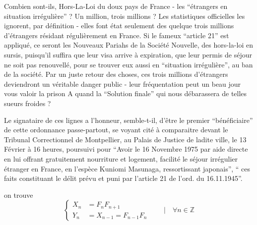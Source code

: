 Combien sont-ils,  Hors-La-Loi du doux pays de France -
les ``étrangers en situation irrégulière'' ? Un million, trois millions ?
Les statistiques officielles les ignorent, par définition - elles font
état seulement des quelque trois millions d'étrangers résidant régulièrement
en France. Si le fameux ``article 21'' est appliqué, ce seront  les
Nouveaux Pariahs de la Société Nouvelle, des hors-la-loi en sursis,
puisqu'il suffira que leur visa arrive à expiration, que leur permis de
séjour ne soit pas renouvellé, pour se trouver eux aussi en ``situation
irrégulière'', au ban de la société. Par un juste retour des choses, ces
trois millions d'étrangers deviendront un véritable danger public - leur
fréquentation peut un beau jour vous valoir la prison\handwritten{!} A quand la ``Solution
finale'' qui nous débarassera de telles sueurs froides ?

Le signataire de ces lignes a l'honneur, semble-t-il, d'être le premier
``bénéficiaire'' de cette ordonnance passe-partout, se voyant cité à
comparaitre devant le Tribunal Correctionnel de Montpellier, au Palais de
Justice de ladite ville, le 13 Février à 16 heures, poursuivi pour ``Avoir
le 16 Novembre 1975 par aide directe en lui offrant gratuitement nourriture
et logement, facilité le séjour irrégulier  étranger en France, en
l'espèce Kuniomi Masunaga, ressortissant japonais'', `` ces faits constituant
le délit prévu et puni par l'article 21 de l'ord. du 16.11.1945''.

on trouve
\[
\left\{\begin{aligned}X_n&=F_nF_{n+1}\\Y_n&=X_{n-1}=F_{n-1}F_n\end{aligned}\right.\qquad\bigg|\quad\forall n\in\mathbb Z
\]


